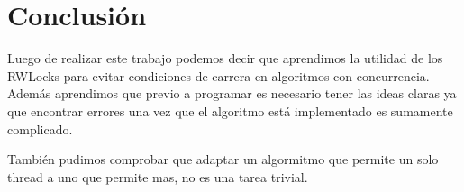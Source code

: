 \section{Conclusión}

Luego de realizar este trabajo podemos decir que aprendimos la utilidad de los RWLocks para evitar condiciones de carrera en algoritmos con concurrencia. 
Además aprendimos que previo a programar es necesario tener las ideas claras ya que encontrar errores una vez que el algoritmo está implementado es sumamente complicado.

También pudimos comprobar que adaptar un algormitmo que permite un solo thread a uno que permite mas, no es una tarea trivial. 